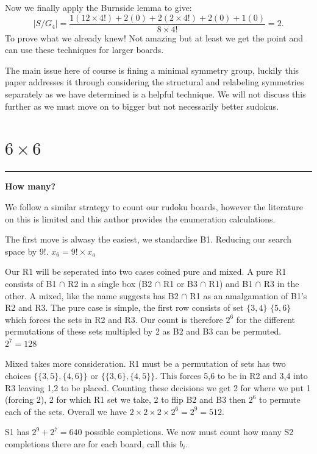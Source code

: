 \documentclass[a4paper,11pt]{report}
\newcounter{row}
\begin{document}
Now we finally apply the Burnside lemma to give:
\begin{equation}|S/G_4|=\frac{1(12\times 4!)+ 2(0)+2(2\times 4!)+2(0)+1(0)}{8\times 4!}=2.\end{equation}
To prove what we already knew! Not amazing but at least we get the point and can use these techniques for larger boards.

The main issue here of course is fining a minimal symmetry group, luckily this paper addresses it \cite{minimal complete shidoku symmetry groups} through considering the structural and relabeling symmetries separately as we have determined is a helpful technique. We will not discuss this further as we must move on to bigger but not necessarily better sudokus.

	\section{$6 \times 6$}
	
\noindent\rule{4cm}{0.4pt}
\textbf{How many?}

We follow a similar strategy to count our rudoku boards, however the literature on this is limited and this author provides the enumeration calculations. 

The first move is alwasy the easiest, we standardise B1. Reducing our search space by 9!.  $x_6=9!\times x_a$

Our R1 will be seperated into two cases coined pure and mixed. A pure R1 consists of B1 $\cap$ R2 in a single box (B2 $\cap$ R1 or B3 $\cap$ R1) and B1 $\cap$ R3 in the other. A mixed, like the name suggests has B2 $\cap$ R1 as an amalgamation of B1's R2 and R3. The pure case is simple, the first row consists of set $\{3,4\}$ $\{5,6\}$ which forces the sets in R2 and R3. Our count is therefore $2^6$ for the different permutations of these sets multipled by 2 as B2 and B3 can be permuted. $2^7=128$

Mixed takes more consideration. R1 must be a permutation of sets has two choices $\{\{3,5\},\{4,6\}\}$ or $\{\{3,6\},\{4,5\}\}$. This forces 5,6 to be in R2 and 3,4 into R3 leaving 1,2 to be placed. Counting these decisions we get 2 for where we put 1 (forcing 2), 2 for which R1 set we take, 2 to flip B2 and B3 then $2^6$ to permute each of the sets. Overall we have $2\times 2 \times 2 \times 2^6=2^9=512$. 

S1 has $2^9+2^7=640$ possible completions. We now must count how many S2 completions there are for each board, call this $b_i$.
\end{document}
